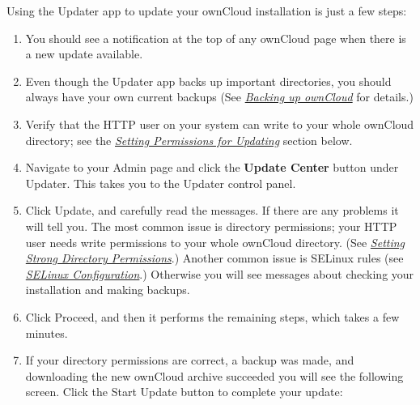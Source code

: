 \documentclass[letterpaper,10pt,english]{sphinxmanual}
\begin{document}
Using the Updater app to update your ownCloud installation is just a few
steps:
\begin{enumerate}
\item {} 
You should see a notification at the top of any ownCloud page when there is
a new update available.

\item {} 
Even though the Updater app backs up important directories, you should
always have your own current backups (See {\hyperref[maintenance/backup::doc]{\emph{Backing up ownCloud}}} for details.)

\item {} 
Verify that the HTTP user on your system can write to your whole ownCloud
directory; see the {\hyperref[maintenance/update:set-updating-permissions-label]{\emph{Setting Permissions for Updating}}} section below.

\item {} 
Navigate to your Admin page and click the \textbf{Update Center} button under
Updater. This takes you to the Updater control panel.

\item {} 
Click Update, and carefully read the messages. If there are any problems it
will tell you. The most common issue is directory permissions; your HTTP
user needs write permissions to your whole ownCloud directory. (See
{\hyperref[installation/installation_wizard:strong-perms-label]{\emph{Setting Strong Directory Permissions}}}.) Another common issue is SELinux rules
(see {\hyperref[installation/selinux_configuration:selinux-config-label]{\emph{SELinux Configuration}}}.) Otherwise you will see messages
about checking your installation and making backups.

\item {} 
Click Proceed, and then it performs the remaining steps, which takes a few
minutes.

\item {} 
If your directory permissions are correct, a backup was made, and
downloading the new ownCloud archive succeeded you will see the following
screen. Click the Start Update button to complete your update:

\end{enumerate}
\end{document}

